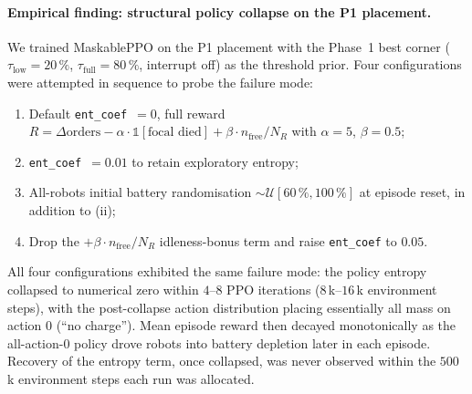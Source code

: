 \documentclass[conference]{IEEEtran}
\begin{document}
\paragraph{Empirical finding: structural policy collapse on the P1 placement.}
We trained MaskablePPO on the P1 placement with the Phase~1 best corner ($\tau_\text{low}=20\,\%$, $\tau_\text{full}=80\,\%$, interrupt off) as the threshold prior. Four configurations were attempted in sequence to probe the failure mode:
\begin{enumerate}
  \item Default \texttt{ent\_coef}~$=0$, full reward $R = \Delta\text{orders} - \alpha\!\cdot\!\mathbb{1}[\text{focal died}] + \beta\!\cdot\!n_\text{free}/N_R$ with $\alpha=5$, $\beta=0.5$;
  \item \texttt{ent\_coef}~$=0.01$ to retain exploratory entropy;
  \item All-robots initial battery randomisation $\sim\!\mathcal{U}[60\,\%,100\,\%]$ at episode reset, in addition to (ii);
  \item Drop the $+\beta\!\cdot\!n_\text{free}/N_R$ idleness-bonus term and raise \texttt{ent\_coef} to $0.05$.
\end{enumerate}
All four configurations exhibited the same failure mode: the policy entropy collapsed to numerical zero within $4$--$8$ PPO iterations ($8$\,k--$16$\,k environment steps), with the post-collapse action distribution placing essentially all mass on action $0$ (``no charge''). Mean episode reward then decayed monotonically as the all-action-0 policy drove robots into battery depletion later in each episode. Recovery of the entropy term, once collapsed, was never observed within the $500$\,k environment steps each run was allocated.
\end{document}
